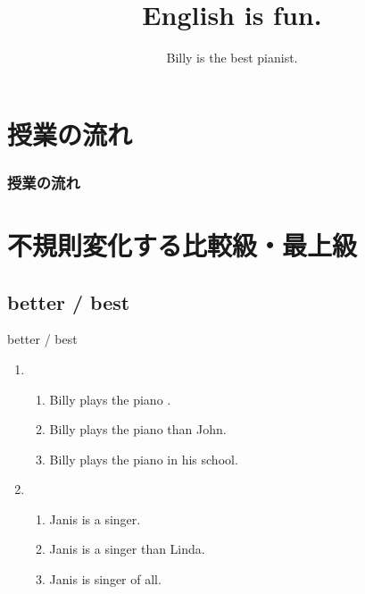 \documentclass[aspectratio=169,xcolor={dvipsnames,table}]{beamer}
\title{English is fun.}
\subtitle{Billy is the best pianist.}
\author{}
\institute[]{}
\date[]
\begin{document}
\begin{frame}[plain]
  \titlepage
\end{frame}

\section*{授業の流れ}
\begin{frame}[plain]
  \frametitle{授業の流れ}
  \tableofcontents
\end{frame}

\section{不規則変化する比較級・最上級}
\subsection{better / best}
\begin{frame}[plain]{better / best}
 \begin{enumerate}
  \item \begin{enumerate}
	 \item<1-> Billy plays the piano .
	 \item<2-> Billy plays the piano  than John.
	 \item<3-> Billy plays the piano  in his school.
	\end{enumerate}
  \item \begin{enumerate}
	 \item<4-> Janis is a  singer.
	 \item<5-> Janis is a  singer than Linda.
	 \item<6-> Janis is  singer of all. 

	\end{enumerate}
 \end{enumerate}

\end{frame}
\end{document}
